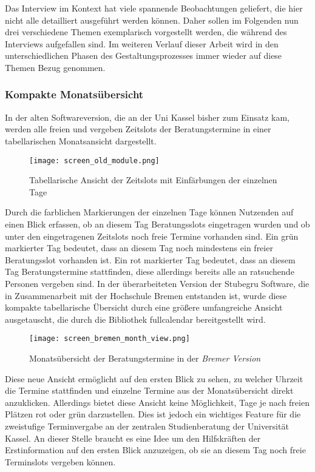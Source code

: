Das Interview im Kontext hat viele spannende Beobachtungen geliefert, die hier
nicht alle detailliert ausgeführt werden können. Daher sollen im Folgenden nun
drei verschiedene Themen exemplarisch vorgestellt werden, die während des
Interviews aufgefallen sind. Im weiteren Verlauf dieser Arbeit wird in den
unterschiedlichen Phasen des Gestaltungsprozesses immer wieder auf diese Themen
Bezug genommen.

\subsubsection{Kompakte Monatsübersicht}
In der alten Softwareversion, die an der Uni Kassel bisher zum Einsatz kam,
werden alle freien und vergeben Zeitslots der Beratungstermine in einer
tabellarischen Monatsansicht dargestellt.

\begin{figure}[H]
    \caption{Tabellarische Ansicht der Zeitslots mit Einfärbungen der einzelnen Tage}
    \centering
    \texttt{[image: screen\_old\_module.png]}
\end{figure}

Durch die farblichen Markierungen der einzelnen Tage können Nutzenden auf einen
Blick erfassen, ob an diesem Tag Beratungsslots eingetragen wurden und ob unter
den eingetragenen Zeitslots noch freie Termine vorhanden sind. Ein grün
markierter Tag bedeutet, dass an diesem Tag noch mindestens ein freier
Beratungsslot vorhanden ist. Ein rot markierter Tag bedeutet, dass an diesem
Tag Beratungstermine stattfinden, diese allerdings bereits alle an ratsuchende
Personen vergeben sind. In der überarbeiteten Version der Stubegru Software,
die in Zusammenarbeit mit der Hochschule Bremen entstanden ist, wurde diese
kompakte tabellarische Übersicht durch eine größere umfangreiche Ansicht
ausgetauscht, die durch die Bibliothek \gls{fullcalendar} bereitgestellt wird.

\begin{figure}[H]
    \caption{Monatsübersicht der Beratungstermine in der \textit{Bremer Version}}
    \centering
    \texttt{[image: screen\_bremen\_month\_view.png]}
\end{figure}

Diese neue Ansicht ermöglicht auf den ersten Blick zu sehen, zu welcher Uhrzeit
die Termine stattfinden und einzelne Termine aus der Monatsübersicht direkt
anzuklicken. Allerdings bietet diese Ansicht keine Möglichkeit, Tage je nach
freien Plätzen rot oder grün darzustellen. Dies ist jedoch ein wichtiges
Feature für die zweistufige Terminvergabe an der zentralen Studienberatung der
Universität Kassel. An dieser Stelle braucht es eine Idee um den Hilfskräften
der Erstinformation auf den ersten Blick anzuzeigen, ob sie an diesem Tag noch
freie Terminslots vergeben können.

